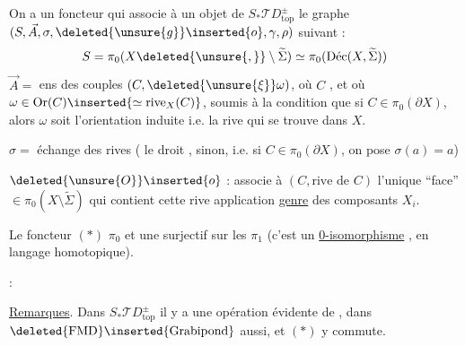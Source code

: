 On a un foncteur
qui associe à un objet  de
$S_*\mathcal TD^\pm_{\mathrm{top}}$ le graphe 
$(S,\vec A,\sigma,\deleted{\unsure{g}}\inserted{o},\gamma,\rho)$ suivant :
\[
S=\pi_0(X\deleted{\unsure{,}}\setminus\widetilde\Sigma)\simeq\pi_0(\text{Déc}(X,\widetilde\Sigma))
\]
$\vec A=$ ens des couples $(C,\deleted{\unsure{\xi}}\omega)$, où
$C$ , et où
$\omega\in\mathrm{Or}(C)\inserted{\simeq\mathrm{rive}_X(C)}$,
soumis à la condition que si $C\in\pi_0(\partial X)$, alors $\omega$
soit l'orientation induite i.e. la rive qui se trouve dans $X$.

$\sigma=$ échange des rives ( le droit ,
sinon, i.e. si $C\in\pi_0(\partial X)$, on pose $\sigma(a)=a$)

$\deleted{\unsure{O}}\inserted{o}$ : associe à $(C,\text{rive de }C)$
l'unique ``face'' $\in\pi_0(X\setminus\widetilde\Sigma)$ qui
contient cette rive 
application \uline{genre} des composants $X_i$.

Le foncteur $(*)$ 
 $\pi_0$ et une surjectif
sur les $\pi_1$ (c'est un \uline{0-isomorphisme} ,
en langage homotopique).

 :

\uline{Remarques}. Dans $S_*\mathcal TD^\pm_{\mathrm{top}}$ il y a une
opération évidente de \uline{} ,
dans $\deleted{\mathrm{FMD}}\inserted{\mathrm{Grabipond}}$ aussi,
et $(*)$ y commute.
